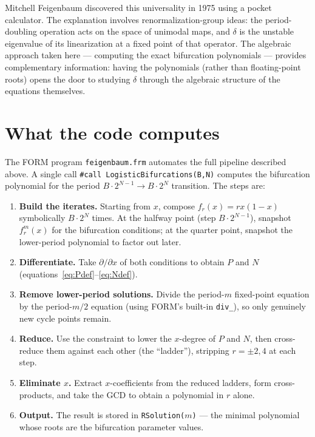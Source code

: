 \documentclass[11pt]{article}
\begin{document}
Mitchell Feigenbaum discovered this universality in 1975 using a pocket
calculator.  The explanation involves renormalization-group ideas: the
period-doubling operation acts on the space of unimodal maps, and $\delta$ is
the unstable eigenvalue of its linearization at a fixed point of that operator.
The algebraic approach taken here --- computing the exact bifurcation
polynomials --- provides complementary information: having the polynomials
(rather than floating-point roots) opens the door to studying $\delta$ through
the algebraic structure of the equations themselves.

\section{What the code computes}
\label{sec:code}

The FORM program \texttt{feigenbaum.frm} automates the full pipeline described
above.  A single call \texttt{\#call LogisticBifurcations(B,N)} computes the
bifurcation polynomial for the period $B\cdot 2^{N-1}\to B\cdot 2^N$
transition.  The steps are:

\begin{enumerate}
\item \textbf{Build the iterates.}  Starting from $x$, compose $f_r(x)=rx(1-x)$
      symbolically $B\cdot 2^N$ times.  At the halfway point (step $B\cdot 2^{N-1}$),
      snapshot $f_r^m(x)$ for the bifurcation conditions; at the quarter point,
      snapshot the lower-period polynomial to factor out later.

\item \textbf{Differentiate.}  Take $\partial/\partial x$ of both conditions to
      obtain $P$ and $N$ (equations~\eqref{eq:Pdef}--\eqref{eq:Ndef}).

\item \textbf{Remove lower-period solutions.}  Divide the period-$m$
      fixed-point equation by the period-$m/2$ equation (using FORM's built-in
      \texttt{div\_}), so only genuinely new cycle points remain.

\item \textbf{Reduce.}  Use the constraint to lower the $x$-degree of $P$ and
      $N$, then cross-reduce them against each other (the ``ladder''), stripping
      $r=\pm2,4$ at each step.

\item \textbf{Eliminate $x$.}  Extract $x$-coefficients from the reduced
      ladders, form cross-products, and take the GCD to obtain a polynomial in
      $r$ alone.

\item \textbf{Output.}  The result is stored in \texttt{RSolution($m$)} ---
      the minimal polynomial whose roots are the bifurcation parameter values.
\end{enumerate}
\end{document}
